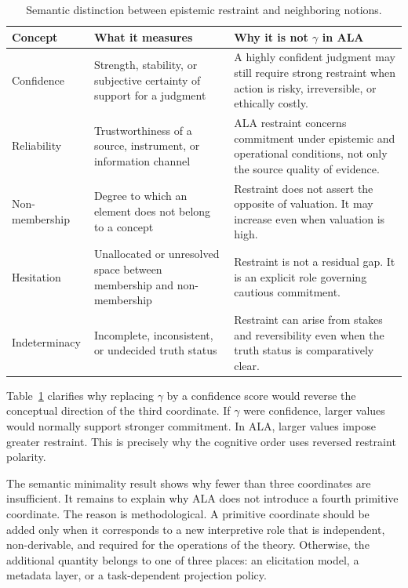 \documentclass[reqno,final]{amsart}
\theoremstyle{definition}
\theoremstyle{plain}
\theoremstyle{remark}
\begin{document}
\begin{table}[!htbp]
\centering
\caption{Semantic distinction between epistemic restraint and neighboring notions.}
\label{tab:restraint-distinction}
\fontsize{10}{12}\selectfont
\setlength{\tabcolsep}{3pt}
\renewcommand{\arraystretch}{1.14}
\begin{tabularx}{\textwidth}{>{\raggedright\arraybackslash}p{1.18in}>{\raggedright\arraybackslash}X>{\raggedright\arraybackslash}X}
\toprule
Concept & What it measures & Why it is not \(\gamma\) in ALA \\
\midrule
Confidence & Strength, stability, or subjective certainty of support for a judgment & A highly confident judgment may still require strong restraint when action is risky, irreversible, or ethically costly. \\
Reliability & Trustworthiness of a source, instrument, or information channel & ALA restraint concerns commitment under epistemic and operational conditions, not only the source quality of evidence. \\
Non-membership & Degree to which an element does not belong to a concept & Restraint does not assert the opposite of valuation. It may increase even when valuation is high. \\
Hesitation & Unallocated or unresolved space between membership and non-membership & Restraint is not a residual gap. It is an explicit role governing cautious commitment. \\
Indeterminacy & Incomplete, inconsistent, or undecided truth status & Restraint can arise from stakes and reversibility even when the truth status is comparatively clear. \\
\bottomrule
\end{tabularx}
\end{table}

Table~\ref{tab:restraint-distinction} clarifies why replacing \(\gamma\) by a confidence score would reverse the conceptual direction of the third coordinate. If \(\gamma\) were confidence, larger values would normally support stronger commitment. In ALA, larger values impose greater restraint. This is precisely why the cognitive order uses reversed restraint polarity.

The semantic minimality result shows why fewer than three coordinates are insufficient. It remains to explain why ALA does not introduce a fourth primitive coordinate. The reason is methodological. A primitive coordinate should be added only when it corresponds to a new interpretive role that is independent, non-derivable, and required for the operations of the theory. Otherwise, the additional quantity belongs to one of three places: an elicitation model, a metadata layer, or a task-dependent projection policy.
\end{document}
